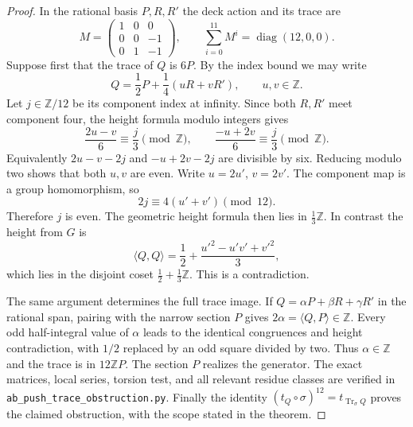 \begin{proof}
In the rational basis $P,R,R'$ the
deck action and its trace are
\[
 M=\begin{pmatrix}1&0&0\\0&0&-1\\0&1&-1\end{pmatrix},
 \qquad \sum_{i=0}^{11}M^i=
       \operatorname{diag}(12,0,0).
\]
Suppose first that the trace of $Q$ is
$6P$. By the index bound we may write
\[
 Q=\frac12P+\frac14(uR+vR'),\qquad u,v\in\mathbb Z.
\]
Let $j\in\mathbb Z/12$ be its component
index at infinity. Since both $R,R'$
meet component four, the height formula
modulo integers gives
\[
 \frac{2u-v}{6}\equiv\frac j3\pmod{\mathbb Z},
 \qquad
 \frac{-u+2v}{6}\equiv\frac j3\pmod{\mathbb Z}.
\]
Equivalently $2u-v-2j$ and $-u+2v-2j$
are divisible by six. Reducing modulo
two shows that both $u,v$ are even.
Write $u=2u'$, $v=2v'$. The component
map is a group homomorphism, so
\[
 2j\equiv4(u'+v')\pmod{12}.
\]
Therefore $j$ is even. The geometric
height formula then lies in
$\tfrac13\mathbb Z$. In contrast the
height from $G$ is
\[
 \langle Q,Q\rangle
 =\frac12+\frac{u'^2-u'v'+v'^2}{3},
\]
which lies in the disjoint coset
$\tfrac12+\tfrac13\mathbb Z$.
This is a contradiction.

The same argument determines the full
trace image. If $Q=\alpha P+\beta R+\gamma R'$
in the rational span, pairing with the
narrow section $P$ gives
$2\alpha=\langle Q,P\rangle\in\mathbb Z$.
Every odd half-integral value of $\alpha$
leads to the identical congruences and
height contradiction, with $1/2$
replaced by an odd square divided by
two. Thus $\alpha\in\mathbb Z$ and
the trace is in $12\mathbb ZP$.
The section $P$ realizes the generator.
The exact matrices, local series,
torsion test, and all relevant residue
classes are verified in
\texttt{ab\_push\_trace\_obstruction.py}.
Finally the identity
$(t_Q\circ\sigma)^{12}=t_{\operatorname{Tr}_\sigma Q}$
proves the claimed obstruction, with
the scope stated in the theorem.
\end{proof}


